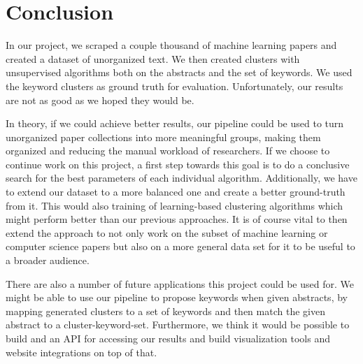 \section{Conclusion}
In our project, we scraped a couple thousand of machine learning papers and created a dataset of unorganized text. We then created clusters with unsupervised algorithms both on the abstracts and the set of keywords.
We used the keyword clusters as ground truth for evaluation. Unfortunately, our results are not as good as we hoped they would be.

In theory, if we could achieve better results, our pipeline could be used to turn unorganized paper collections into more meaningful groups, making them organized and reducing the manual workload of researchers.
If we choose to continue work on this project, a first step towards this goal is to do a conclusive search for the best parameters of each individual algorithm.
Additionally, we have to extend our dataset to a more balanced one and create a better ground-truth from it. This would also training of learning-based clustering algorithms which might perform better than our previous approaches.
It is of course vital to then extend the approach to not only work on the subset of machine learning or computer science papers but also on a more general data set for it to be useful to a broader audience.

There are also a number of future applications this project could be used for.
We might be able to use our pipeline to propose keywords when given abstracts, by mapping generated clusters to a set of keywords and then match the given abstract to a cluster-keyword-set.
Furthermore, we think it would be possible to build and an API for accessing our results and build visualization tools and website integrations on top of that. 
